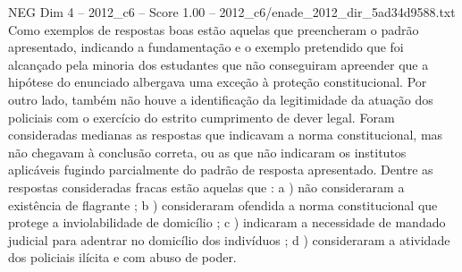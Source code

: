 \begin{textsample}{NEG Dim 4 – 2012\_c6 – Score 1.00 – 2012\_c6/enade\_2012\_dir\_5ad34d9588.txt}
Como exemplos de respostas boas estão aquelas que preencheram o padrão apresentado, indicando a fundamentação e o exemplo pretendido que foi alcançado pela minoria dos estudantes que não conseguiram apreender que a hipótese do enunciado albergava uma exceção à proteção constitucional.
Por outro lado, também não houve a identificação da legitimidade da atuação dos policiais com o exercício do estrito cumprimento de dever legal.
Foram consideradas medianas as respostas que indicavam a norma constitucional, mas não chegavam à conclusão correta, ou as que não indicaram os institutos aplicáveis fugindo parcialmente do padrão de resposta apresentado.
Dentre as respostas consideradas fracas estão aquelas que : a ) não consideraram a existência de flagrante ; b ) consideraram ofendida a norma constitucional que protege a inviolabilidade de domicílio ; c ) indicaram a necessidade de mandado judicial para adentrar no domicílio dos indivíduos ; d ) consideraram a atividade dos policiais ilícita e com abuso de poder.

\end{textsample}
